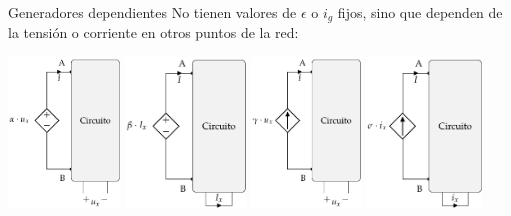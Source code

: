\documentclass[aspectratio=169, xcolor={usenames,svgnames,dvipsnames}]{beamer}
\begin{document}
\begin{frame}{Generadores dependientes}
    No tienen valores de $\epsilon$ o $i_g$ fijos, sino que \alert{dependen de la tensión o corriente en otros puntos de la red}:
	\begin{center}
		\includegraphics[height=4cm]{../figs/FuenteTensionDependienteTension.pdf}\label{fig.tension-tension}\hfill
		\includegraphics[height=4cm]{../figs/FuenteTensionDependienteCorriente.pdf}\label{fig.tension-corriente}\hfill
		\includegraphics[height=4cm]{../figs/FuenteCorrienteDependienteTension.pdf}\label{fig.corriente-tension}\hfill
		\includegraphics[height=4cm]{../figs/FuenteCorrienteDependienteCorriente.pdf}\label{fig.corriente-corriente}
	\end{center}
\end{frame}
\end{document}
